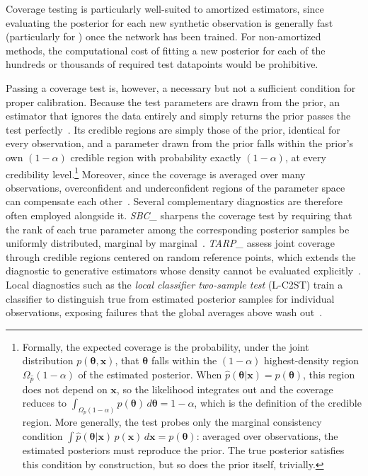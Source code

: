 Coverage testing is particularly well-suited to amortized \SBI estimators, since evaluating the posterior for each new synthetic observation is generally fast (particularly for \NPE) once the network has been trained.
For non-amortized methods, the computational cost of fitting a new posterior for each of the hundreds or thousands of required test datapoints would be prohibitive.

Passing a coverage test is, however, a necessary but not a sufficient condition for proper calibration.
Because the test parameters are drawn from the prior, an estimator that ignores the data entirely and simply returns the prior passes the test perfectly~\cite{Hermans:2021rqv,Lemos:2023}.
Its credible regions are simply those of the prior, identical for every observation, and a parameter drawn from the prior falls within the prior's own $(1-\alpha)$ credible region with probability exactly $(1-\alpha)$, at every credibility level.\footnote{Formally, the expected coverage is the probability, under the joint distribution $p(\boldsymbol{\theta}, \mathbf{x})$, that $\boldsymbol{\theta}$ falls within the $(1-\alpha)$ highest-density region $\Omega_{\hat{p}}(1-\alpha)$ of the estimated posterior. When $\hat{p}(\boldsymbol{\theta}|\mathbf{x}) = p(\boldsymbol{\theta})$, this region does not depend on $\mathbf{x}$, so the likelihood integrates out and the coverage reduces to $\int_{\Omega_{p}(1-\alpha)} p(\boldsymbol{\theta}) \, d\boldsymbol{\theta} = 1-\alpha$, which is the definition of the credible region. More generally, the test probes only the marginal consistency condition $\int \hat{p}(\boldsymbol{\theta}|\mathbf{x}) \, p(\mathbf{x}) \, d\mathbf{x} = p(\boldsymbol{\theta})$: averaged over observations, the estimated posteriors must reproduce the prior. The true posterior satisfies this condition by construction, but so does the prior itself, trivially.}
Moreover, since the coverage is averaged over many observations, overconfident and underconfident regions of the parameter space can compensate each other~\cite{Hermans:2021rqv}.
Several complementary diagnostics are therefore often employed alongside it.
\emph{\Gls{SBC_}} sharpens the coverage test by requiring that the rank of each true parameter among the corresponding posterior samples be uniformly distributed, marginal by marginal~\cite{Talts:2018}.
\emph{\Gls{TARP_}} assess joint coverage through credible regions centered on random reference points, which extends the diagnostic to generative estimators whose density cannot be evaluated explicitly~\cite{Lemos:2023}.
Local diagnostics such as the \emph{local classifier two-sample test} (L-C2ST) train a classifier to distinguish true from estimated posterior samples for individual observations, exposing failures that the global averages above wash out~\cite{Linhart:2023}.
